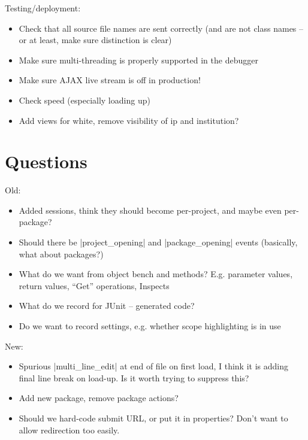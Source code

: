 \documentclass{book}
\begin{document}
Testing/deployment:

\begin{itemize}
\item Check that all source file names are sent correctly (and are not class
  names -- or at least, make sure distinction is clear)
\item Make sure multi-threading is properly supported in the debugger
\item Make sure AJAX live stream is off in production!
\item Check speed (especially loading up)
\item Add views for white, remove visibility of ip and institution?
\end{itemize}

\section{Questions}

Old:
\begin{itemize}
\item Added sessions, think they should become per-project, and maybe even per-package?
\item Should there be |project_opening| and |package_opening| events
  (basically, what about packages?)
\item What do we want from object bench and methods?  E.g. parameter values,
  return values, ``Get'' operations, Inspects
\item What do we record for JUnit -- generated code?
\item Do we want to record settings, e.g. whether scope highlighting is in
  use
\end{itemize}

New:
\begin{itemize}
\item Spurious |multi_line_edit| at end of file on first load, I think it is adding final
  line break on load-up.  Is it worth trying to suppress this?
\item Add new package, remove package actions?
\item Should we hard-code submit URL, or put it in properties?  Don't want to
  allow redirection too easily.
\end{itemize}
\end{document}
